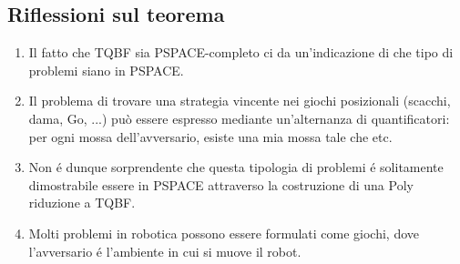 \documentclass[a4paper, 12pt]{article}
\begin{document}
\subsection{Riflessioni sul teorema}
\begin{enumerate}
\item Il fatto che TQBF sia PSPACE-completo ci da un’indicazione di che tipo di problemi siano in PSPACE.
\item Il problema di trovare una strategia vincente nei giochi posizionali (scacchi, dama, Go, ...) può essere espresso mediante un’alternanza di quantificatori: per ogni mossa dell’avversario, esiste una mia mossa tale che etc.
\item Non é dunque sorprendente che questa tipologia di problemi é solitamente dimostrabile essere in PSPACE attraverso la costruzione di una Poly riduzione a TQBF.
\item Molti problemi in robotica possono essere formulati come giochi, dove l’avversario é l’ambiente in cui si muove il robot.
\end{enumerate}
\end{document}
